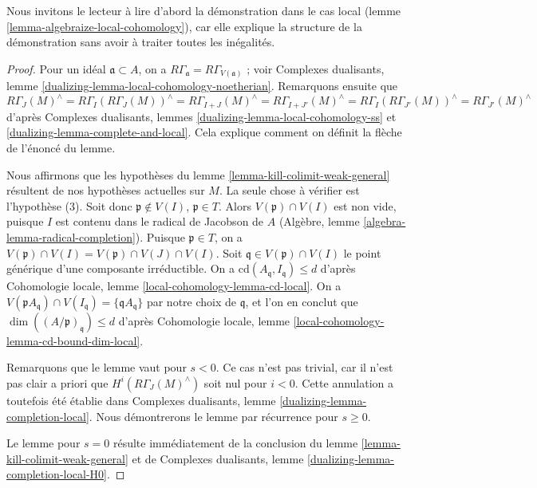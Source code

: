 \noindent
Nous invitons le lecteur à lire d'abord la démonstration dans le cas local
(lemme \ref{lemma-algebraize-local-cohomology}), car elle explique la structure
de la démonstration sans avoir à traiter toutes les inégalités.

\begin{proof}
Pour un idéal $\mathfrak a \subset A$, on a
$R\Gamma_\mathfrak a = R\Gamma_{V(\mathfrak a)}$ ; voir
Complexes dualisants, lemme \ref{dualizing-lemma-local-cohomology-noetherian}.
Remarquons ensuite que
$$
R\Gamma_J(M)^\wedge =
R\Gamma_I(R\Gamma_J(M))^\wedge =
R\Gamma_{I + J}(M)^\wedge =
R\Gamma_{I + J'}(M)^\wedge =
R\Gamma_I(R\Gamma_{J'}(M))^\wedge =
R\Gamma_{J'}(M)^\wedge
$$
d'après Complexes dualisants, lemmes \ref{dualizing-lemma-local-cohomology-ss} et
\ref{dualizing-lemma-complete-and-local}.
Cela explique comment on définit la flèche de l'énoncé du lemme.

\medskip\noindent
Nous affirmons que les hypothèses du lemme \ref{lemma-kill-colimit-weak-general}
résultent de nos hypothèses actuelles sur $M$.
La seule chose à vérifier est l'hypothèse (3).
Soit donc $\mathfrak p \not \in V(I)$, $\mathfrak p \in T$.
Alors $V(\mathfrak p) \cap V(I)$ est non vide, puisque $I$ est
contenu dans le radical de Jacobson de $A$
(Algèbre, lemme \ref{algebra-lemma-radical-completion}).
Puisque $\mathfrak p \in T$, on a
$V(\mathfrak p) \cap V(I) = V(\mathfrak p) \cap V(J) \cap V(I)$.
Soit $\mathfrak q \in V(\mathfrak p) \cap V(I)$ le
point générique d'une composante irréductible.
On a $\text{cd}(A_\mathfrak q, I_\mathfrak q) \leq d$
d'après Cohomologie locale, lemme \ref{local-cohomology-lemma-cd-local}.
On a $V(\mathfrak pA_\mathfrak q) \cap V(I_\mathfrak q) =
\{\mathfrak qA_\mathfrak q\}$ par notre choix de $\mathfrak q$,
et l'on en conclut que $\dim((A/\mathfrak p)_\mathfrak q) \leq d$
d'après Cohomologie locale, lemme \ref{local-cohomology-lemma-cd-bound-dim-local}.

\medskip\noindent
Remarquons que le lemme vaut pour $s < 0$. Ce cas n'est pas trivial, car
il n'est pas clair a priori que $H^i(R\Gamma_J(M)^\wedge)$
soit nul pour $i < 0$. Cette annulation a toutefois été établie dans
Complexes dualisants, lemme \ref{dualizing-lemma-completion-local}.
Nous démontrerons le lemme par récurrence pour $s \geq 0$.

\medskip\noindent
Le lemme pour $s = 0$ résulte immédiatement de
la conclusion du lemme \ref{lemma-kill-colimit-weak-general}
et de Complexes dualisants, lemme \ref{dualizing-lemma-completion-local-H0}.


\end{proof}
